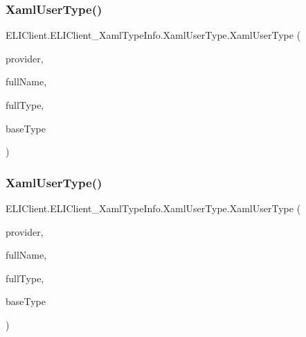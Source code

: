 \subsubsection{\texorpdfstring{Xaml\+User\+Type()}{XamlUserType()}\hspace{0.1cm}{\footnotesize\ttfamily [2/3]}}
{\footnotesize\ttfamily E\+L\+I\+Client.\+E\+L\+I\+Client\+\_\+\+Xaml\+Type\+Info.\+Xaml\+User\+Type.\+Xaml\+User\+Type (\begin{DoxyParamCaption}\item[{global\+::\+E\+L\+I\+Client.\+E\+L\+I\+Client\+\_\+\+Xaml\+Type\+Info.\+Xaml\+Type\+Info\+Provider}]{provider,  }\item[{string}]{full\+Name,  }\item[{global\+::\+System.\+Type}]{full\+Type,  }\item[{global\+::\+Windows.\+U\+I.\+Xaml.\+Markup.\+I\+Xaml\+Type}]{base\+Type }\end{DoxyParamCaption})\hspace{0.3cm}{\ttfamily [inline]}}

\mbox{\label{class_e_l_i_client_1_1_e_l_i_client___xaml_type_info_1_1_xaml_user_type_a909746a87650e014303a361f94cf2fa9}} 
\subsubsection{\texorpdfstring{Xaml\+User\+Type()}{XamlUserType()}\hspace{0.1cm}{\footnotesize\ttfamily [3/3]}}
{\footnotesize\ttfamily E\+L\+I\+Client.\+E\+L\+I\+Client\+\_\+\+Xaml\+Type\+Info.\+Xaml\+User\+Type.\+Xaml\+User\+Type (\begin{DoxyParamCaption}\item[{global\+::\+E\+L\+I\+Client.\+E\+L\+I\+Client\+\_\+\+Xaml\+Type\+Info.\+Xaml\+Type\+Info\+Provider}]{provider,  }\item[{string}]{full\+Name,  }\item[{global\+::\+System.\+Type}]{full\+Type,  }\item[{global\+::\+Windows.\+U\+I.\+Xaml.\+Markup.\+I\+Xaml\+Type}]{base\+Type }\end{DoxyParamCaption})\hspace{0.3cm}{\ttfamily [inline]}}



